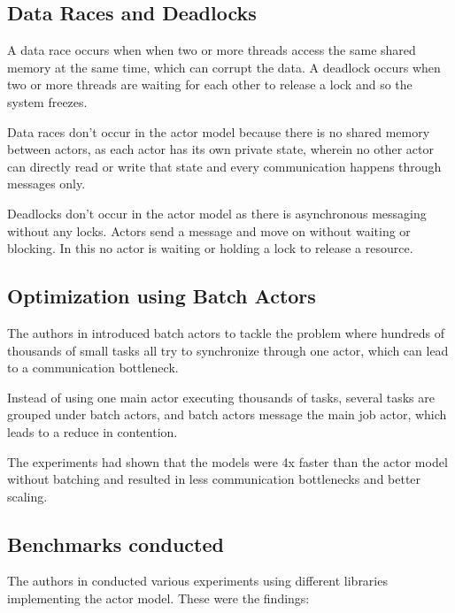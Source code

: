 \subsection{Data Races and Deadlocks}
A data race occurs when when two or more threads access the same shared memory at the same time, which can corrupt the data. A deadlock occurs when two or more threads are waiting for each other to release a lock and so the system freezes. 

Data races don't occur in the actor model because there is no shared memory between actors, as each actor has its own private state, wherein no other actor can directly read or write that state and every communication happens through messages only. 

Deadlocks don't occur in the actor model as there is asynchronous messaging without any locks. Actors send a message and move on without waiting or blocking. In this no actor is waiting or holding a lock to release a resource.

\subsection{Optimization using Batch Actors}
The authors in \cite{10820772} introduced batch actors to tackle the problem where hundreds of thousands of small tasks all try to synchronize through one actor, which can lead to a communication bottleneck.

Instead of using one main actor executing thousands of tasks, several tasks are grouped under batch actors, and batch actors message the main job actor, which leads to a reduce in contention. 

The experiments had shown that the models were 4x faster than the actor model without batching and resulted in less communication bottlenecks and better scaling.

\subsection{Benchmarks conducted}
The authors in \cite{8892329} conducted various experiments using different libraries implementing the actor model. These were the findings:

